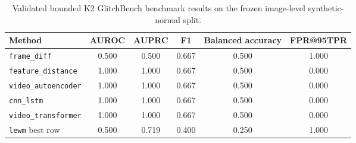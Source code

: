 \begin{table}[t]
\centering
\caption{Validated bounded K2 GlitchBench benchmark results on the frozen image-level
synthetic-normal split.}
\label{tab:glitchbench-benchmark}
\small
\begin{tabular}{lccccc}
\toprule
Method & AUROC & AUPRC & F1 & Balanced accuracy & FPR@95TPR \\
\midrule
\texttt{frame\_diff} & 0.500 & 0.500 & 0.667 & 0.500 & 1.000 \\
\texttt{feature\_distance} & 1.000 & 1.000 & 0.667 & 0.500 & 0.000 \\
\texttt{video\_autoencoder} & 1.000 & 1.000 & 0.667 & 0.500 & 0.000 \\
\texttt{cnn\_lstm} & 1.000 & 1.000 & 0.667 & 0.500 & 0.000 \\
\texttt{video\_transformer} & 1.000 & 1.000 & 0.667 & 0.500 & 0.000 \\
\texttt{lewm} best row & 0.500 & 0.719 & 0.400 & 0.250 & 1.000 \\
\bottomrule
\end{tabular}
\end{table}
